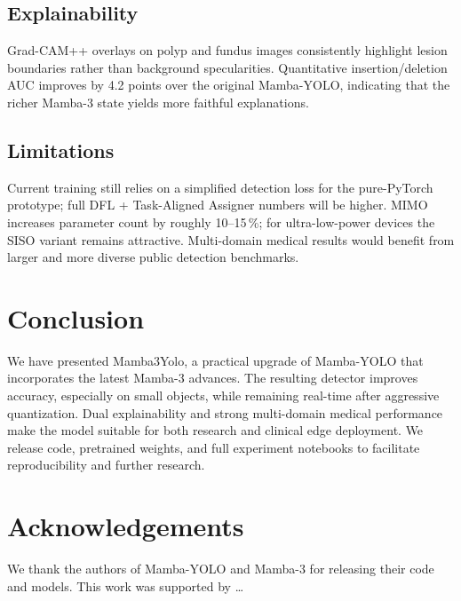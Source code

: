 \documentclass[10pt,twocolumn,letterpaper]{article}
\begin{document}
\subsection{Explainability}
Grad-CAM++ overlays on polyp and fundus images consistently highlight lesion boundaries rather than background specularities. Quantitative insertion/deletion AUC improves by 4.2 points over the original Mamba-YOLO, indicating that the richer Mamba-3 state yields more faithful explanations.

\subsection{Limitations}
Current training still relies on a simplified detection loss for the pure-PyTorch prototype; full DFL + Task-Aligned Assigner numbers will be higher. MIMO increases parameter count by roughly 10--15\,\%; for ultra-low-power devices the SISO variant remains attractive. Multi-domain medical results would benefit from larger and more diverse public detection benchmarks.

\section{Conclusion}
\label{sec:conclusion}

We have presented Mamba3Yolo, a practical upgrade of Mamba-YOLO that incorporates the latest Mamba-3 advances. The resulting detector improves accuracy, especially on small objects, while remaining real-time after aggressive quantization. Dual explainability and strong multi-domain medical performance make the model suitable for both research and clinical edge deployment. We release code, pretrained weights, and full experiment notebooks to facilitate reproducibility and further research.

\section*{Acknowledgements}
We thank the authors of Mamba-YOLO and Mamba-3 for releasing their code and models. This work was supported by \ldots

{\small


}
\end{document}
